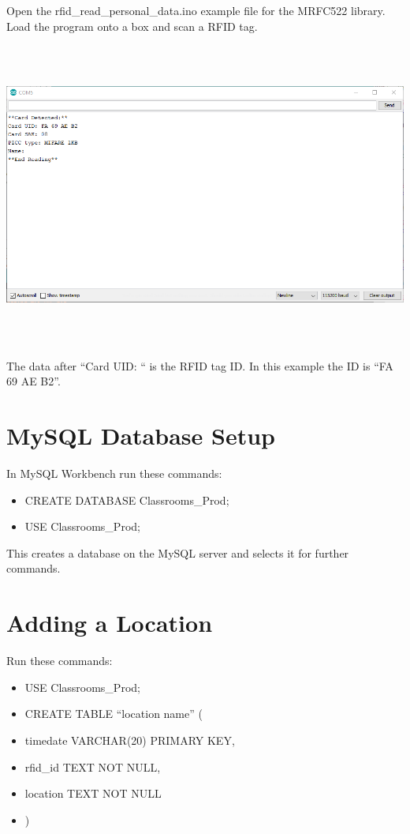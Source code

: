 \documentclass[12pt]{article}
\begin{document}
\begin{spacing}{1.2}
Open the rfid\_read\_personal\_data.ino example file for the MRFC522 library. Load the program onto a box and scan a RFID tag. 

\begin{center}
\includegraphics[height=10cm]{Serial 2.PNG}
\end{center}

The data after ``Card UID: `` is the RFID tag ID. In this example the ID is ``FA 69 AE B2''.

\section{MySQL Database Setup}

In MySQL Workbench run these commands:
\begin{itemize}
	\item CREATE DATABASE Classrooms\_Prod;
	\item USE Classrooms\_Prod;
\end{itemize}
This creates a database on the MySQL server and selects it for further commands.

\section{Adding a Location}

Run these commands:
\begin{itemize}
	\item USE Classrooms\_Prod;
	\item CREATE TABLE ``location name'' (
	\item timedate VARCHAR(20) PRIMARY KEY,
	\item rfid\_id TEXT NOT NULL,
	\item location TEXT NOT NULL
	\item )
\end{itemize}


\end{spacing}
\end{document}
